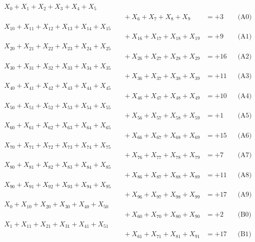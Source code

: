 \documentclass[a4paper,10pt]{article}
\begin{document}
\allowdisplaybreaks
{\small
\begin{align}
X_{0} + X_{1} + X_{2} + X_{3} + X_{4} + X_{5} \\[0.1ex]
&\quad  + X_{6} + X_{7} + X_{8} + X_{9} &= +3 && \text{(A0)} \\
X_{10} + X_{11} + X_{12} + X_{13} + X_{14} + X_{15} \\[0.1ex]
&\quad  + X_{16} + X_{17} + X_{18} + X_{19} &= +9 && \text{(A1)} \\
X_{20} + X_{21} + X_{22} + X_{23} + X_{24} + X_{25} \\[0.1ex]
&\quad  + X_{26} + X_{27} + X_{28} + X_{29} &= +16 && \text{(A2)} \\
X_{30} + X_{31} + X_{32} + X_{33} + X_{34} + X_{35} \\[0.1ex]
&\quad  + X_{36} + X_{37} + X_{38} + X_{39} &= +11 && \text{(A3)} \\
X_{40} + X_{41} + X_{42} + X_{43} + X_{44} + X_{45} \\[0.1ex]
&\quad  + X_{46} + X_{47} + X_{48} + X_{49} &= +10 && \text{(A4)} \\
\allowbreak
X_{50} + X_{51} + X_{52} + X_{53} + X_{54} + X_{55} \\[0.1ex]
&\quad  + X_{56} + X_{57} + X_{58} + X_{59} &= +1 && \text{(A5)} \\
X_{60} + X_{61} + X_{62} + X_{63} + X_{64} + X_{65} \\[0.1ex]
&\quad  + X_{66} + X_{67} + X_{68} + X_{69} &= +15 && \text{(A6)} \\
X_{70} + X_{71} + X_{72} + X_{73} + X_{74} + X_{75} \\[0.1ex]
&\quad  + X_{76} + X_{77} + X_{78} + X_{79} &= +7 && \text{(A7)} \\
X_{80} + X_{81} + X_{82} + X_{83} + X_{84} + X_{85} \\[0.1ex]
&\quad  + X_{86} + X_{87} + X_{88} + X_{89} &= +11 && \text{(A8)} \\
X_{90} + X_{91} + X_{92} + X_{93} + X_{94} + X_{95} \\[0.1ex]
&\quad  + X_{96} + X_{97} + X_{98} + X_{99} &= +17 && \text{(A9)} \\
\allowbreak
X_{0} + X_{10} + X_{20} + X_{30} + X_{40} + X_{50} \\[0.1ex]
&\quad  + X_{60} + X_{70} + X_{80} + X_{90} &= +2 && \text{(B0)} \\
X_{1} + X_{11} + X_{21} + X_{31} + X_{41} + X_{51} \\[0.1ex]
&\quad  + X_{61} + X_{71} + X_{81} + X_{91} &= +17 && \text{(B1)} \\

\end{align}}
\end{document}
